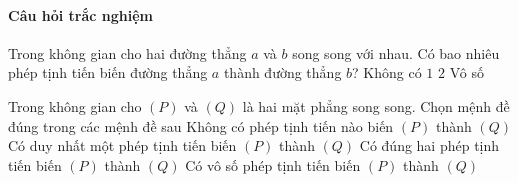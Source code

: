 \paragraph{Câu hỏi trắc nghiệm}
\begin{ex}%
	Trong không gian cho hai đường thẳng $a$ và $b$ song song với nhau. Có bao nhiêu phép tịnh tiến biến đường thẳng $a$ thành đường thẳng $b$?
	\choice
	{Không có}
	{$1$}
	{$2$}
	{\True Vô số}
\end{ex}
\begin{ex}%
	Trong không gian cho $(P)$ và $(Q)$ là hai mặt phẳng song song. Chọn mệnh đề đúng trong các mệnh đề sau
	\choice
	{Không có phép tịnh tiến nào biến $(P)$ thành $(Q)$}
	{Có duy nhất một phép tịnh tiến biến $(P)$ thành $(Q)$}
	{Có đúng hai phép tịnh tiến biến $(P)$ thành $(Q)$}
	{\True Có vô số phép tịnh tiến biến $(P)$ thành $(Q)$}
\end{ex}
